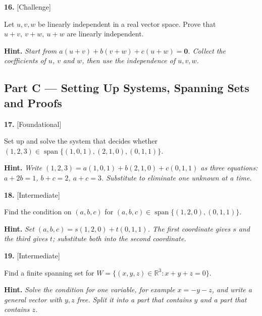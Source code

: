 \documentclass[11pt]{article}
\begin{document}
\begin{minipage}{\linewidth}\textbf{16.} \hfill{\scriptsize\color{ink}[Challenge]}\par\nopagebreak Let $u,v,w$ be linearly independent in a real vector space. Prove that $u+v,\ v+w,\ u+w$ are linearly independent.
\par\smallskip\begingroup\small\color{ink}\textbf{Hint.} \textit{Start from $a(u+v)+b(v+w)+c(u+w)=\mathbf 0$. Collect the coefficients of $u$, $v$ and $w$, then use the independence of $u,v,w$.}\endgroup
\vspace{5.0cm}\end{minipage}\par\vspace{4pt}
\subsection*{\normalsize\color{ink} Part C --- Setting Up Systems, Spanning Sets and Proofs}
\begin{minipage}{\linewidth}\textbf{17.} \hfill{\scriptsize\color{ink}[Foundational]}\par\nopagebreak Set up and solve the system that decides whether $(1,2,3)\in\operatorname{span}\{(1,0,1),(2,1,0),(0,1,1)\}$.
\par\smallskip\begingroup\small\color{ink}\textbf{Hint.} \textit{Write $(1,2,3)=a(1,0,1)+b(2,1,0)+c(0,1,1)$ as three equations: $a+2b=1$, $b+c=2$, $a+c=3$. Substitute to eliminate one unknown at a time.}\endgroup
\vspace{4.6cm}\end{minipage}\par\vspace{4pt}
\begin{minipage}{\linewidth}\textbf{18.} \hfill{\scriptsize\color{ink}[Intermediate]}\par\nopagebreak Find the condition on $(a,b,c)$ for $(a,b,c)\in\operatorname{span}\{(1,2,0),(0,1,1)\}$.
\par\smallskip\begingroup\small\color{ink}\textbf{Hint.} \textit{Set $(a,b,c)=s(1,2,0)+t(0,1,1)$. The first coordinate gives $s$ and the third gives $t$; substitute both into the second coordinate.}\endgroup
\vspace{4.4cm}\end{minipage}\par\vspace{4pt}
\begin{minipage}{\linewidth}\textbf{19.} \hfill{\scriptsize\color{ink}[Intermediate]}\par\nopagebreak Find a finite spanning set for $W=\{(x,y,z)\in\mathbb{R}^{3}:x+y+z=0\}$.
\par\smallskip\begingroup\small\color{ink}\textbf{Hint.} \textit{Solve the condition for one variable, for example $x=-y-z$, and write a general vector with $y,z$ free. Split it into a part that contains $y$ and a part that contains $z$.}\endgroup
\vspace{4.4cm}\end{minipage}\par\vspace{4pt}
\end{document}

